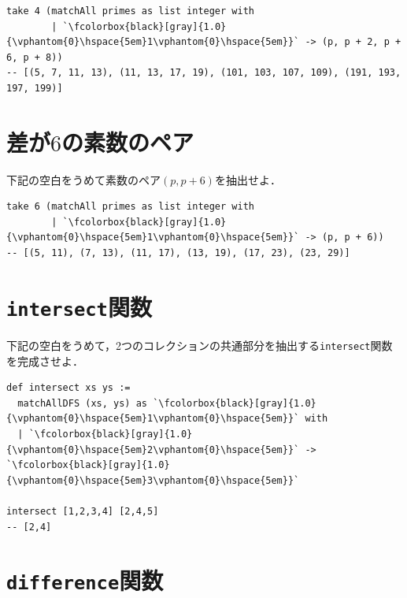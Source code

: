 \begin{lstlisting}[language=egison]
take 4 (matchAll primes as list integer with
        | `\fcolorbox{black}[gray]{1.0}{\vphantom{0}\hspace{5em}1\vphantom{0}\hspace{5em}}` -> (p, p + 2, p + 6, p + 8))
-- [(5, 7, 11, 13), (11, 13, 17, 19), (101, 103, 107, 109), (191, 193, 197, 199)]
\end{lstlisting}

\section*{差が$6$の素数のペア}

下記の空白をうめて素数のペア$(p, p+6)$を抽出せよ．

\begin{lstlisting}[language=egison]
take 6 (matchAll primes as list integer with
        | `\fcolorbox{black}[gray]{1.0}{\vphantom{0}\hspace{5em}1\vphantom{0}\hspace{5em}}` -> (p, p + 6))
-- [(5, 11), (7, 13), (11, 17), (13, 19), (17, 23), (23, 29)]
\end{lstlisting}

\section*{\texttt{intersect}関数}

下記の空白をうめて，2つのコレクションの共通部分を抽出する\lstinline{intersect}関数を完成させよ．

\begin{lstlisting}[language=egison]
def intersect xs ys :=
  matchAllDFS (xs, ys) as `\fcolorbox{black}[gray]{1.0}{\vphantom{0}\hspace{5em}1\vphantom{0}\hspace{5em}}` with
  | `\fcolorbox{black}[gray]{1.0}{\vphantom{0}\hspace{5em}2\vphantom{0}\hspace{5em}}` -> `\fcolorbox{black}[gray]{1.0}{\vphantom{0}\hspace{5em}3\vphantom{0}\hspace{5em}}`

intersect [1,2,3,4] [2,4,5]
-- [2,4]
\end{lstlisting}

\section*{\texttt{difference}関数}

